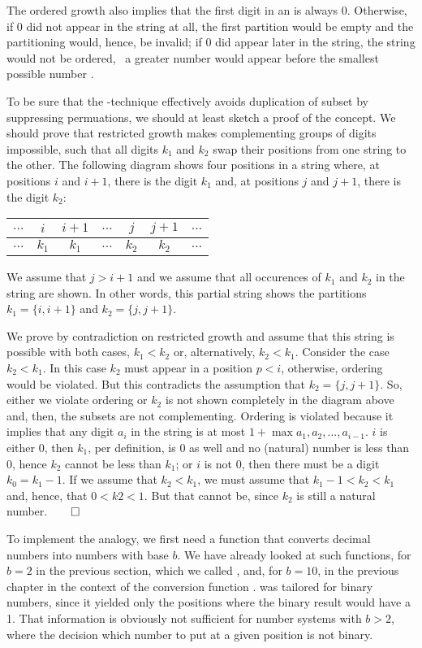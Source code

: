 \documentclass{scrreprt}
\newcommand{\texfamily}{\fontfamily{cmtex}\selectfont}
\begin{document}
The ordered growth also implies 
that the first digit in an  is always 0.
Otherwise, if 0 did not appear in the string at all,
the first partition would be empty and
the partitioning would, hence, be invalid;
if 0 did appear later in the string,
the string would not be ordered, \ie\
a greater number would appear 
before the smallest possible number \text{\texfamily zero}.

To be sure that the -technique effectively
avoids duplication of subset by suppressing permuations,
we should at least sketch a proof of the concept.
We should prove that restricted growth makes 
complementing groups of digits impossible, such
that all digits $k_1$ and $k_2$ swap their positions
from one string to the other.
The following diagram shows four positions
in a string where, at positions $i$ and $i+1$,
there is the digit $k_1$ and, at positions $j$ and $j+1$,
there is the digit $k_2$:

\begin{tabular}{c|c|c|c|c|c|c}
$\dots$ & $i$   & $i+1$ & $\dots$ & $j$   & $j+1$ & $\dots$\\\hline
$\dots$ & $k_1$ & $k_1$ & $\dots$ & $k_2$ & $k_2$ & $\dots$
\end{tabular}

We assume that $j > i+1$ and we assume that all occurences of $k_1$ and $k_2$
in the string are shown.
In other words, this partial string shows the partitions
$k_1 = \lbrace i,i+1\rbrace$ and
$k_2 = \lbrace j,j+1\rbrace$.

We prove by contradiction on restricted growth and assume
that this string is possible with both cases,
$k_1 < k_2$ or, alternatively, $k_2 < k_1$.
Consider the case $k_2 < k_1$.
In this case $k_2$ must appear in a position $p < i$,
otherwise, ordering would be violated. 
But this contradicts the assumption that $k_2 = \lbrace j,j+1\rbrace$.
So, either we violate ordering or $k_2$ is not shown completely
in the diagram above and, then, the subsets are not complementing. 
Ordering is violated because it implies that any digit $a_i$ in the string
is at most $1 + \max{a_1, a_2, \dots, a_{i-1}}$.
$i$ is either 0, then $k_1$, per definition, is 0 as well
and no (natural) number is less than 0, 
hence $k_2$ cannot be less than $k_1$;
or $i$ is not 0, then there must be a digit $k_0 = k_1 - 1$.
If we assume that $k_2 < k_1$, we must assume that 
$k_1 - 1 < k_2 < k_1$ and, hence, that $0 < k2 < 1$.
But that cannot be, 
since $k_2$ is still a natural number.$\qed$

To implement the  analogy,
we first need a function that converts decimal numbers
into numbers with base $b$.
We have already looked at such functions,
for $b = 2$ in the previous section,
which we called \text{\texfamily binExp}, and, for $b=10$,
in the previous chapter in the context of
the conversion function \text{\texfamily integer2Num}.
\text{\texfamily binExp} was tailored for binary numbers,
since it yielded only the positions 
where the binary result would have a 1.
That information is obviously not sufficient
for number systems with $b > 2$, where the decision
which number to put at a given position is not binary.
\end{document}
